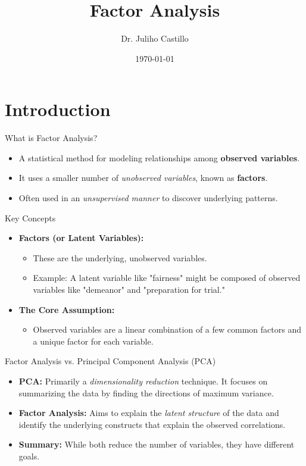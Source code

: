 \documentclass[aspectratio=169]{beamer}
\title{Factor Analysis}
\author{Dr. Juliho Castillo}
\institute{Tecnológico de Monterrey}
\date{\today}
\begin{document}
\begin{frame}
    \titlepage
\end{frame}

\begin{frame}
    \tableofcontents
\end{frame}


\section{Introduction}

\begin{frame}{What is Factor Analysis?}
  \begin{itemize}
    \item A statistical method for modeling relationships among \textbf{observed variables}.
    \item It uses a smaller number of \textit{unobserved variables}, known as \textbf{factors}.
    \item Often used in an \textit{unsupervised manner} to discover underlying patterns.
  \end{itemize}
\end{frame}

\begin{frame}{Key Concepts}
  \begin{itemize}
    \item \textbf{Factors (or Latent Variables):}
      \begin{itemize}
        \item These are the underlying, unobserved variables.
        \item Example: A latent variable like "fairness" might be composed of observed variables like "demeanor" and "preparation for trial."
      \end{itemize}
    \item \textbf{The Core Assumption:}
      \begin{itemize}
        \item Observed variables are a linear combination of a few common factors and a unique factor for each variable.
      \end{itemize}
  \end{itemize}
\end{frame}

\begin{frame}{Factor Analysis vs. Principal Component Analysis (PCA)}
  \begin{itemize}
    \item \textbf{PCA:} Primarily a \textit{dimensionality reduction} technique. It focuses on summarizing the data by finding the directions of maximum variance.
    \item \textbf{Factor Analysis:} Aims to explain the \textit{latent structure} of the data and identify the underlying constructs that explain the observed correlations.
    \item \textbf{Summary:} While both reduce the number of variables, they have different goals.
  \end{itemize}
\end{frame}
\end{document}
